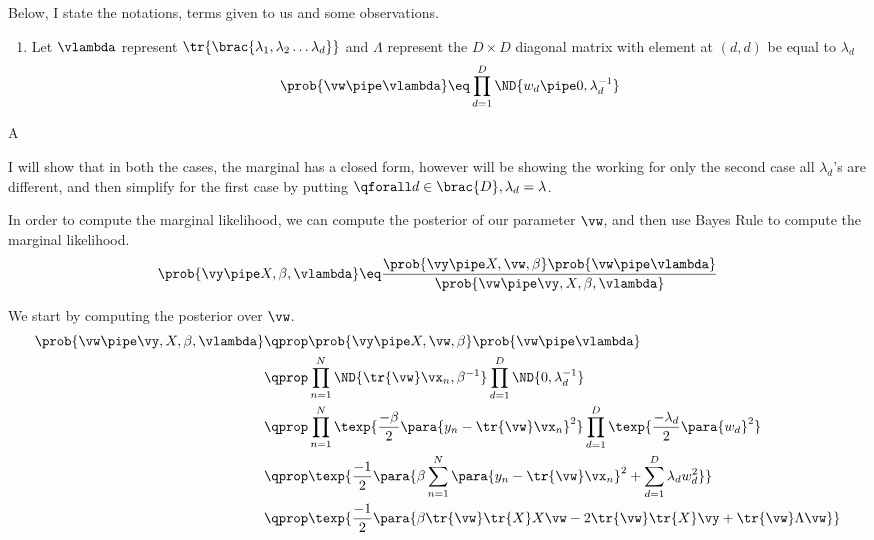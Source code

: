 \documentclass{article}
\begin{document}
\makeheader

\begin{question}

	Below, I state the notations, terms given to us and some observations.

	\begin{enumerate}[label=\bt{\theenumi.}]
		\ditem[Likelihood]
			\begin{align*}
				\prob{\vy \pipe X, \vw, \beta}	\eq	\prod_{n = 1}^N \ND{y_n \pipe \tr{\vw} \vx_n, \beta^{-1}}
			\end{align*}
		\item Let $\vlambda$ represent $\tr{\brac{\lambda_1, \lambda_2 \dots \lambda_d}}$ and $\Lambda$ represent the $D \times D$ diagonal matrix with element at $(d, d)$ be equal to $\lambda_d$
		\ditem[Prior]
			\begin{align*}
				\prob{\vw \pipe \vlambda}	\eq	\prod_{d = 1}^D \ND{w_d \pipe 0, \lambda_d^{-1}}
			\end{align*}
	\end{enumerate}

	\begin{qpart}{A}

		I will show that in both the cases, the marginal has a closed form, however will be showing the working for only the second case \ie all $\lambda_d$'s are different, and then simplify for the first case by putting $\qforall d \in \brac{D}, \lambda_d = \lambda$.

		In order to compute the marginal likelihood, we can compute the posterior of our parameter \ie $\vw$, and then use Bayes Rule to compute the marginal likelihood.
		\begin{equation}
			\prob{\vy \pipe X, \beta, \vlambda}	\eq	\frac{\prob{\vy \pipe X, \vw, \beta} \prob{\vw \pipe \vlambda}}{\prob{\vw \pipe \vy, X, \beta, \vlambda}}
			\label{eq:q1-bayes}
		\end{equation}

		We start by computing the posterior over $\vw$.
		\begin{align*}
			\prob{\vw \pipe \vy, X, \beta, \vlambda}	&\qprop	\prob{\vy \pipe X, \vw, \beta} \prob{\vw \pipe \vlambda} \\
			&\qprop	\prod_{n = 1}^N \ND{\tr{\vw} \vx_n, \beta^{-1}} \prod_{d = 1}^D \ND{0, \lambda_d^{-1}} \\
			&\qprop \prod_{n = 1}^N \texp{\frac{-\beta}{2} \para{y_n - \tr{\vw} \vx_n}^2} \prod_{d = 1}^D \texp{\frac{-\lambda_d}{2} \para{w_d}^2} \\
			&\qprop \texp{\frac{-1}{2} \para{ \beta \sum_{n = 1}^N \para{y_n - \tr{\vw} \vx_n}^2 + \sum_{d = 1}^D \lambda_d w_d^2}} \\
			&\qprop	\texp{\frac{-1}{2} \para{\beta \tr{\vw} \tr{X} X \vw - 2 \tr{\vw} \tr{X} \vy + \tr{\vw} \Lambda \vw}}
		\end{align*}


\end{qpart}
\end{question}
\end{document}
